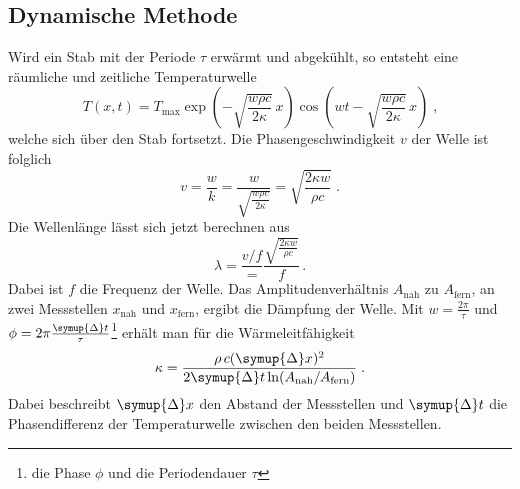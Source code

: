\subsection{Dynamische Methode}
\label{sec:dyM}
Wird ein Stab mit der Periode $\tau$ erwärmt und abgekühlt, so entsteht eine räumliche und zeitliche Temperaturwelle
\begin{equation}
    T(x,t)=T_\text{max} \exp \left({-\sqrt{\frac{w \rho c}{2 \kappa}}}\, x \right)\cos \left( wt-\sqrt{\frac{w \rho c}{2 \kappa}}\, x\right)\; \text{,}
\end{equation}
welche sich über den Stab fortsetzt. Die Phasengeschwindigkeit $v$ der Welle ist folglich
\begin{equation}
    v=\frac{w}{k}=\frac{w}{\sqrt{\frac{w \rho c}{2 \kappa}}}=\sqrt{\frac{2\kappa w}{\rho c}}\; \text{.}
\end{equation}
Die Wellenlänge lässt sich jetzt berechnen aus
\begin{equation}
    \lambda= \frac{v/f}= \frac{\sqrt{\frac{2\kappa w}{\rho c}}}{f} \, \text{.}
    \label{eqn:wellenlänge}
\end{equation}
Dabei ist $f$ die Frequenz der Welle.
Das Amplitudenverhältnis $A_\text{nah}$ zu $A_\text{fern}$, an zwei Messstellen $x_\text{nah}$ und $x_\text{fern}$, ergibt die Dämpfung der Welle.
Mit $w=\frac{2\pi}{\tau}$ und $\phi=2\pi \frac{\symup{\Delta}t}{\tau}$\footnote{die Phase $\phi$ und die Periodendauer $\tau$} erhält man für die Wärmeleitfähigkeit
\begin{equation}
    \kappa=\frac{\rho\, c (\symup{\Delta}x)^2}{2\symup{\Delta}t \ln (A_\text{nah}/A_\text{fern})}\; \text{.}
\end{equation}
Dabei beschreibt $\symup{\Delta}x$ den Abstand der Messstellen und $\symup{\Delta}t$ die Phasendifferenz der Temperaturwelle zwischen den beiden Messstellen.

